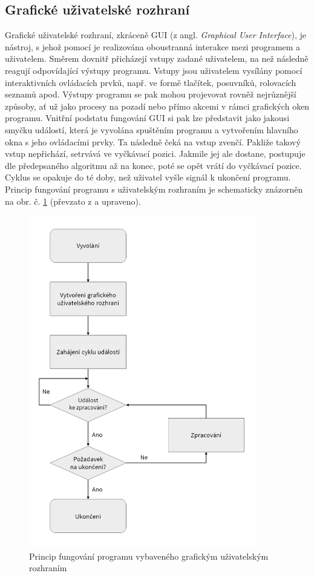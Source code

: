 \documentclass[a4paper, 12pt]{article}
\begin{document}
\subsection{Grafické uživatelské rozhraní} \label{sec:GUI}
Grafické uživatelské rozhraní, zkráceně GUI (z angl. \textit{Graphical User Interface}), je nástroj, s jehož pomocí je realizována oboustranná interakce mezi programem a uživatelem. Směrem dovnitř přicházejí vstupy zadané uživatelem, na než následně reagují odpovídající výstupy programu. Vstupy jsou uživatelem vysílány pomocí interaktivních ovládacích prvků, např. ve formě tlačítek, posuvníků, rolovacích seznamů apod. Výstupy programu se pak mohou projevovat rovněž nejrůznější způsoby, ať už jako procesy na pozadí nebo přímo akcemi v rámci grafických oken programu. Vnitřní podstatu fungování GUI si pak lze představit jako jakousi  smyčku událostí, která je vyvolána spuštěním programu a vytvořením hlavního okna s jeho ovládacími prvky. Ta následně čeká na vstup zvenčí. Pakliže takový vstup nepřichází, setrvává ve vyčkávací pozici. Jakmile jej ale dostane, postupuje dle předepsaného algoritmu až na konec, poté se opět vrátí do vyčkávací pozice. Cyklus se opakuje do té doby, než uživatel vyšle signál k ukončení programu. Princip fungování programu s uživatelským rozhraním je schematicky znázorněn na obr. č. \ref{fig:Gui} (převzato z \cite{Python3Summerfield:2} a upraveno).
\clearpage
\begin{figure}[ht!]
    \centering
    \includegraphics[width=0.8\linewidth,height=14.5cm]{gui_princip.png}\vspace{0.25cm}
    \caption{Princip fungování programu vybaveného grafickým uživatelským rozhraním}
    \label{fig:Gui}
\end{figure}
\end{document}
